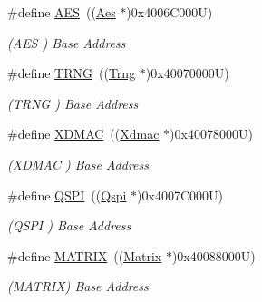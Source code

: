 \begin{DoxyCompactItemize}
\mbox{\label{group__SAME70J20__base_ga5412ac9ff64f4ab68c289a0da739eaef}} 
\#define \mbox{\hyperlink{group__SAME70J20__base_ga5412ac9ff64f4ab68c289a0da739eaef}{A\+ES}}~((\mbox{\hyperlink{structAes}{Aes}}    $\ast$)0x4006\+C000\+U)
\begin{DoxyCompactList}\small\item\em (A\+ES ) Base Address \end{DoxyCompactList}\item 
\mbox{\label{group__SAME70J20__base_ga4cab97ed4b9b87448b2338e4c13c9862}} 
\#define \mbox{\hyperlink{group__SAME70J20__base_ga4cab97ed4b9b87448b2338e4c13c9862}{T\+R\+NG}}~((\mbox{\hyperlink{structTrng}{Trng}}   $\ast$)0x40070000\+U)
\begin{DoxyCompactList}\small\item\em (T\+R\+NG ) Base Address \end{DoxyCompactList}\item 
\mbox{\label{group__SAME70J20__base_ga605482ac0afa782a315f3b556c2f018b}} 
\#define \mbox{\hyperlink{group__SAME70J20__base_ga605482ac0afa782a315f3b556c2f018b}{X\+D\+M\+AC}}~((\mbox{\hyperlink{structXdmac}{Xdmac}}  $\ast$)0x40078000\+U)
\begin{DoxyCompactList}\small\item\em (X\+D\+M\+AC ) Base Address \end{DoxyCompactList}\item 
\mbox{\label{group__SAME70J20__base_gac24e1e8116a508fa623bdaf91e7f9b63}} 
\#define \mbox{\hyperlink{group__SAME70J20__base_gac24e1e8116a508fa623bdaf91e7f9b63}{Q\+S\+PI}}~((\mbox{\hyperlink{structQspi}{Qspi}}   $\ast$)0x4007\+C000\+U)
\begin{DoxyCompactList}\small\item\em (Q\+S\+PI ) Base Address \end{DoxyCompactList}\item 
\mbox{\label{group__SAME70J20__base_gaf1d98fb728b5c7300f80dd782702d1dd}} 
\#define \mbox{\hyperlink{group__SAME70J20__base_gaf1d98fb728b5c7300f80dd782702d1dd}{M\+A\+T\+R\+IX}}~((\mbox{\hyperlink{structMatrix}{Matrix}} $\ast$)0x40088000\+U)
\begin{DoxyCompactList}\small\item\em (M\+A\+T\+R\+IX) Base Address \end{DoxyCompactList}\item 

\end{DoxyCompactItemize}

